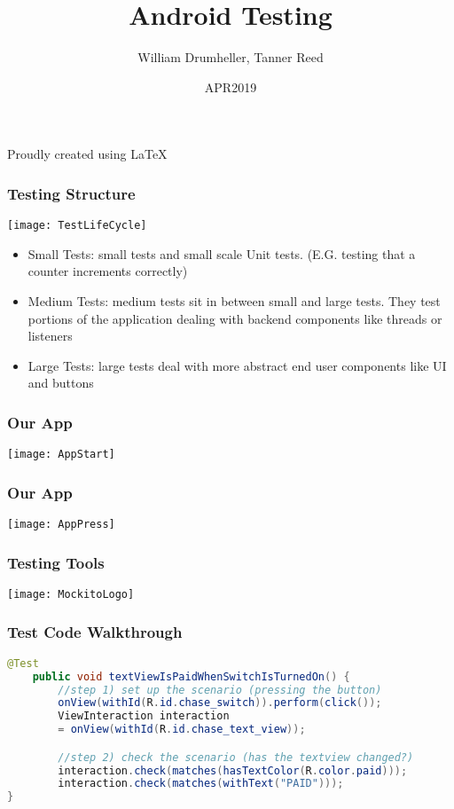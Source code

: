 \documentclass[10pt]{beamer}
\title{Android Testing}
\author{William Drumheller, Tanner Reed}
\date{APR2019}
\begin{document}
\begin{frame}
\titlepage
\begin{center}
Proudly created using \LaTeX
\end{center}
\end{frame}

\begin{frame}
\frametitle{Testing Structure}
\center\texttt{[image: TestLifeCycle]}
\begin{itemize}
	\item Small Tests: small tests and small scale Unit tests. (E.G. testing that a counter increments correctly)
    	\item Medium Tests: medium tests sit in between small and large tests. They test portions of the application dealing with backend components like threads or listeners
	\item Large Tests: large tests deal with more abstract end user components like UI and buttons
\end{itemize}
\end{frame}

\begin{frame}
\frametitle{Our App}
\center\texttt{[image: AppStart]}
\end{frame}

\begin{frame}
\frametitle{Our App}
\center\texttt{[image: AppPress]}
\end{frame}

\begin{frame}
\frametitle{Testing Tools}
\center\texttt{[image: MockitoLogo]}
\end{frame}


\begin{frame}[fragile]
\frametitle{Test Code Walkthrough}
\begin{lstlisting}[language=java,caption={Test Code Walkthrough}]		
@Test
    public void textViewIsPaidWhenSwitchIsTurnedOn() {
		//step 1) set up the scenario (pressing the button)       
        onView(withId(R.id.chase_switch)).perform(click());
        ViewInteraction interaction 
		= onView(withId(R.id.chase_text_view));

		//step 2) check the scenario (has the textview changed?)
        interaction.check(matches(hasTextColor(R.color.paid)));
        interaction.check(matches(withText("PAID")));
}
\end{lstlisting}
\end{frame}
\end{document}
